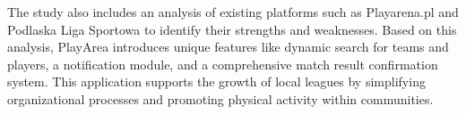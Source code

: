 \documentclass[wmii,inf,inz]{uwmthesis} %
\begin{document}
The study also includes an analysis of existing platforms such as Playarena.pl and Podlaska Liga Sportowa to identify their strengths and weaknesses. Based on this analysis, PlayArea introduces unique features like dynamic search for teams and players, a notification module, and a comprehensive match result confirmation system. This application supports the growth of local leagues by simplifying organizational processes and promoting physical activity within communities.
\listoffigures
\listoftables
\end{document}
